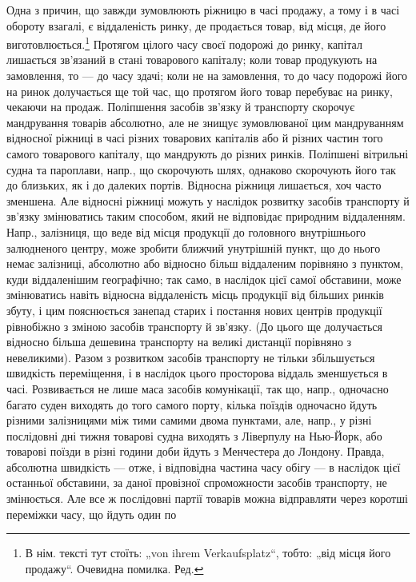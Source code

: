 Одна з причин, що завжди зумовлюють ріжницю в часі продажу, а
тому і в часі обороту взагалі, є віддаленість ринку, де продається товар,
від місця, де його виготовлюється.\footnote*{
В нім. тексті тут стоїть: „von ihrem Verkaufsplatz“, тобто: „від місця його продажу“.
Очевидна помилка. Ред.
} Протягом цілого часу своєї подорожі
до ринку, капітал лишається зв’язаний в стані товарового капіталу;
коли товар продукують на замовлення, то — до часу здачі; коли не на замовлення,
то до часу подорожі його на ринок долучається ще той час,
що протягом його товар перебуває на ринку, чекаючи на продаж. Поліпшення
засобів зв’язку й транспорту скорочує мандрування товарів абсолютно,
але не знищує зумовлюваної цим мандруванням відносної ріжниці
в часі різних товарових капіталів або й різних частин того самого товарового
капіталу, що мандрують до різних ринків. Поліпшені вітрильні
судна та пароплави, напр., що скорочують шлях, однаково скорочують
його так до близьких, як і до далеких портів. Відносна ріжниця лишається,
хоч часто зменшена. Але відносні ріжниці можуть у наслідок розвитку
засобів транспорту й зв’язку змінюватись таким способом, який не відповідає
природним віддаленням. Напр., залізниця, що веде від місця продукції до
головного внутрішнього залюдненого центру, може зробити ближчий
унутрішній пункт, що до нього немає залізниці, абсолютно або відносно
більш віддаленим порівняно з пунктом, куди віддаленішим географічно; так
само, в наслідок цієї самої обставини, може змінюватись навіть відносна
віддаленість місць продукції від більших ринків збуту, і цим пояснюється
занепад старих і постання нових центрів продукції рівнобіжно з зміною
засобів транспорту й зв’язку. (До цього ще долучається відносно більша
дешевина транспорту на великі дистанції порівняно з невеликими). Разом
з розвитком засобів транспорту не тільки збільшується швидкість
переміщення, і в наслідок цього просторова віддаль зменшується в часі.
Розвивається не лише маса засобів комунікації, так що, напр., одночасно
багато суден виходять до того самого порту, кілька поїздів одночасно
йдуть різними залізницями між тими самими двома пунктами, але, напр.,
у різні послідовні дні тижня товарові судна виходять з Ліверпулу на
Нью-Йорк, або товарові поїзди в різні години доби йдуть з Менчестера
до Лондону. Правда, абсолютна швидкість — отже, і відповідна частина
часу обігу — в наслідок цієї останньої обставини, за даної провізної спроможности
засобів транспорту, не змінюється. Але все ж послідовні партії товарів
можна відправляти через коротші переміжки часу, що йдуть один по
